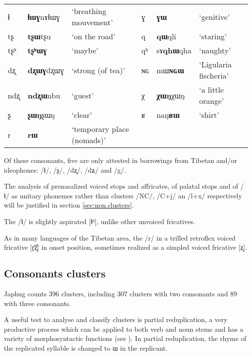 \documentclass[oldfontcommands,oneside,a4paper,11pt]{article}
\newcommand{\ipa}[1]{{\phon #1}} %
\begin{document}
\begin{table}
{\begin{tabular}{lll|lll}
ɬ   & 	  \ipa{\textbf{ɬɯɣ}nɤɬɯɣ}   & 	 `breathing mouvement' & 	ɣ & 	\ipa{\textbf{ɣɯ}}   & 	 `genitive' \\ 
tʂ   & 	  \ipa{\textbf{tʂɯ}tʂu}   & 	 `on the road' & 	q & 	\ipa{\textbf{qɯ}qli}   & 	 `staring' \\ 
tʂʰ   & 	  \ipa{\textbf{tʂʰɯɣ}}   & 	 `maybe' & 	qʰ & 	\ipa{sɤ\textbf{qhɯ}qha}   & 	 `naughty' \\ 
dʐ   & 	\ipa{\textbf{dʐɯɣ}dʐɯɣ}   & 	 `strong (of tea)' & 	ɴɢ & 	\ipa{mɯ\textbf{ɴɢɯ}}  & 	 `Ligularia fischeria' \\ 
ndʐ & 	\ipa{\textbf{ndʐɯ}nbu}   & 	 `guest' & 	χ & 	\ipa{\textbf{χɯŋ}χɯŋ}   & 	 `a little orange' \\ 
ʂ & 	\ipa{\textbf{ʂɯŋ}ʂɯŋ}   & 	 `clear' & 	ʁ & 	\ipa{naŋ\textbf{ʁɯ}}   & 	 `shirt' \\ 
r & 	\ipa{\textbf{rɯ}}   & 	 `temporary place (nomads)' & 	  & 	 & 	 \\ 
\bottomrule
\end{tabular}}
\end{table}

Of these consonants, five are only attested in borrowings from Tibetan and/or ideophones: /ɬ/, /ʂ/, /dʐ/, /dʑ/ and /g/.

The analysis of prenasalized voiced stops and affricates, of palatal stops and of /ɬ/ as unitary phonemes rather than clusters /NC/, /C+j/ an /l+x/ respectively will be justified in section \ref{sec:non.clusters}. 

The /ɬ/ is slightly aspirated [ɬʰ], unlike other unvoiced fricatives.


As in many languages of the Tibetan area, the /r/ in a trilled retroflex voiced fricative [ɽ͡ʐ] in onset position, sometimes realized as a simpled voiced fricative [ʐ].


  \subsection{Consonants clusters} \label{sec:clusters}
  Japhug counts 396 clusters, including  307 clusters with two consonants and 89 with three consonants.
  
 A useful test to analyse and classify clusters is partial reduplication, a very productive process which can be applied to both verb and noun stems and has a variety of morphosyntactic functions (see \citealt{jacques07redupl}). In partial reduplication, the rhyme of the replicated syllable is changed to \ipa{ɯ} in the replicant.
 
\end{document}
